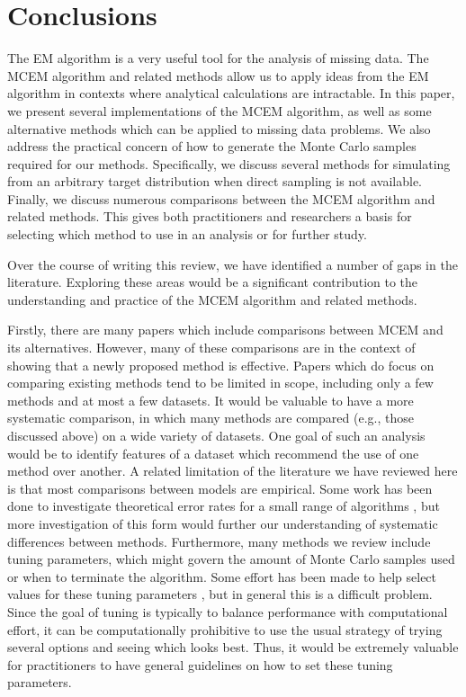 \documentclass[ss]{imsart}
\theoremstyle{plain}
\theoremstyle{definition}
\theoremstyle{remark}
\begin{document}
\section{Conclusions}
\label{sec:conc}

The EM algorithm is a very useful tool for the analysis of missing data. The MCEM algorithm and related methods allow us to apply ideas from the EM algorithm in contexts where analytical calculations are intractable. In this paper, we present several implementations of the MCEM algorithm, as well as some alternative methods which can be applied to missing data problems. We also address the practical concern of how to generate the Monte Carlo samples required for our methods. Specifically, we discuss several methods for simulating from an arbitrary target distribution when direct sampling is not available. Finally, we discuss numerous comparisons between the MCEM algorithm and related methods. This gives both practitioners and researchers a basis for selecting which method to use in an analysis or for further study.

Over the course of writing this review, we have identified a number of gaps in the literature. Exploring these areas would be a significant contribution to the understanding and practice of the MCEM algorithm and related methods.

Firstly, there are many papers which include comparisons between MCEM and its alternatives. However, many of these comparisons are in the context of showing that a newly proposed method is effective. Papers which do focus on comparing existing methods tend to be limited in scope, including only a few methods and at most a few datasets. It would be valuable to have a more systematic comparison, in which many methods are compared (e.g., those discussed above) on a wide variety of datasets. One goal of such an analysis would be to identify features of a dataset which recommend the use of one method over another. A related limitation of the literature we have reviewed here is that most comparisons between models are empirical. Some work has been done to investigate theoretical error rates for a small range of algorithms \citep{Boo01, Jan03}, but more investigation of this form would further our understanding of systematic differences between methods. Furthermore, many methods we review include tuning parameters, which might govern the amount of Monte Carlo samples used or when to terminate the algorithm. Some effort has been made to help select values for these tuning parameters \citep[e.g.,][]{Jan06,Bae16}, but in general this is a difficult problem. Since the goal of tuning is typically to balance performance with computational effort, it can be computationally prohibitive to use the usual strategy of trying several options and seeing which looks best. Thus, it would be extremely valuable for practitioners to have general guidelines on how to set these tuning parameters.
\end{document}
